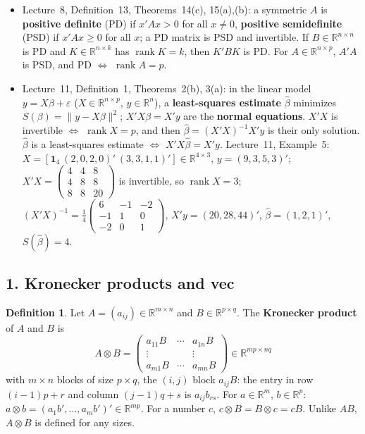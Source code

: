 \documentclass[12pt]{article}
\newcommand{\R}{\mathbb R}
\newcommand{\one}{\mathbf 1}
\DeclareMathOperator{\tr}{tr}
\DeclareMathOperator{\rank}{rank}
\theoremstyle{definition}
\newtheorem{definition}[theorem]{Definition}
\newcommand{\lec}[1]{Lecture~#1}
\begin{document}
\begin{itemize}[itemsep=0pt,parsep=0pt,topsep=2pt]
\(\lVert x-y\rVert\); \(\lVert cx\rVert=\lvert c\rvert\,\lVert x\rVert\) (\(c\in\R\)). \lec{13}, Definition~2: the
\textbf{Frobenius norm} \(\lVert A\rVert_F=\bigl(\tr(A'A)\bigr)^{1/2}=\bigl(\sum_i\sum_ja_{ij}^2\bigr)^{1/2}\).
\item \lec{8}, Definition~13, Theorems~14(c), 15(a),(b): a symmetric \(A\) is \textbf{positive definite} (PD) if \(x'Ax>0\) for all \(x\ne0\),
\textbf{positive semidefinite} (PSD) if \(x'Ax\geqslant0\) for all \(x\); a PD matrix is PSD and invertible. If
\(B\in\R^{n\times n}\) is PD and \(K\in\R^{n\times k}\) has \(\rank K=k\), then \(K'BK\) is PD. For
\(A\in\R^{n\times p}\), \(A'A\) is PSD, and PD \(\iff\) \(\rank A=p\).
\item \lec{11}, Definition~1, Theorems~2(b), 3(a): in the linear model \(y=X\beta+\varepsilon\)
(\(X\in\R^{n\times p}\), \(y\in\R^n\)), a \textbf{least-squares estimate} \(\hat\beta\) minimizes
\(S(\beta)=\lVert y-X\beta\rVert^2\); \(X'X\beta=X'y\) are the \textbf{normal equations}. \(X'X\) is invertible \(\iff\)
\(\rank X=p\), and then \(\hat\beta=(X'X)^{-1}X'y\) is their only solution. \(\hat\beta\) is a least-squares estimate
\(\iff\) \(X'X\hat\beta=X'y\). \lec{11}, Example~5: \(X=[\one_4\ (2,0,2,0)'\ (3,3,1,1)']\in\R^{4\times3}\), \(y=(9,3,5,3)'\);
\(X'X=\left(\begin{smallmatrix}4&4&8\\4&8&8\\8&8&20\end{smallmatrix}\right)\) is invertible, so \(\rank X=3\);
\((X'X)^{-1}=\frac14\left(\begin{smallmatrix}6&-1&-2\\-1&1&0\\-2&0&1\end{smallmatrix}\right)\), \(X'y=(20,28,44)'\),
\(\hat\beta=(1,2,1)'\), \(S(\hat\beta)=4\).
\end{itemize}

\subsection*{1. Kronecker products and vec}

\begin{definition}\label{b16.1}
Let \(A=(a_{ij})\in\R^{m\times n}\) and \(B\in\R^{p\times q}\). The \textbf{Kronecker product} of \(A\) and \(B\) is
\[
A\otimes B=\begin{pmatrix}a_{11}B&\cdots&a_{1n}B\\\vdots&&\vdots\\a_{m1}B&\cdots&a_{mn}B\end{pmatrix}\in\R^{mp\times nq}
\]
with \(m\times n\) blocks of size \(p\times q\), the \((i,j)\) block \(a_{ij}B\): the entry in row \((i-1)p+r\) and column
\((j-1)q+s\) is \(a_{ij}b_{rs}\). For \(a\in\R^m\), \(b\in\R^p\): \(a\otimes b=(a_1b',\dots,a_mb')'\in\R^{mp}\). For a
number \(c\), \(c\otimes B=B\otimes c=cB\). Unlike \(AB\), \(A\otimes B\) is defined for any sizes.
\end{definition}
\end{document}
